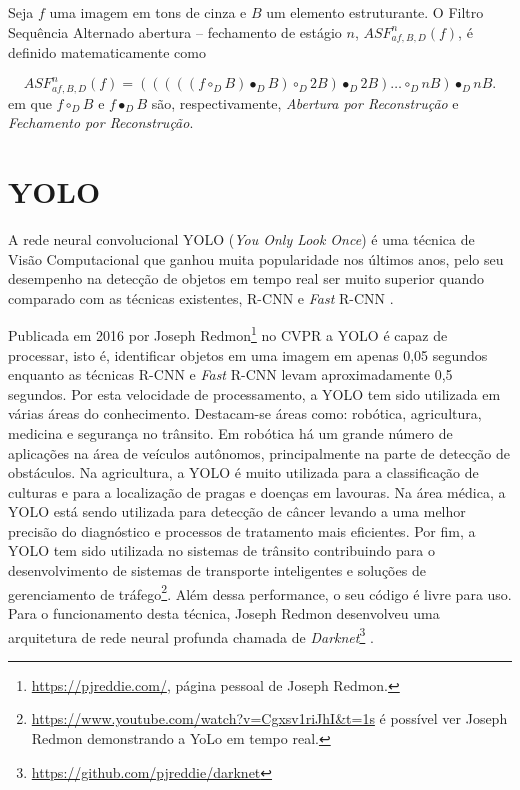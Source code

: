 \begin{define}
	Seja $f$ uma imagem em tons de cinza e $B$ um elemento estruturante. O Filtro Sequência Alternado abertura -- fechamento de estágio $n$, $ASF^{n}_{af,B,D}(f)$, é definido matematicamente como
	
	\begin{equation}
		ASF^{n}_{af,B,D}(f) = (((((f \circ_D B) \bullet_D B) \circ_D 2B) \bullet_D 2B) \dots \circ_D nB) \bullet_D nB. 
	\end{equation}
	em que $f \circ_D B$ e $f \bullet_D B$ são, respectivamente, \textit{Abertura por Reconstrução} e \textit{Fechamento por Reconstrução}.
\end{define}

\section{YOLO}

A rede neural convolucional YOLO (\textit{You Only Look Once}) é uma técnica de Visão Computacional que ganhou muita popularidade nos últimos anos, pelo seu desempenho na detecção de objetos em tempo real ser muito superior quando comparado com as técnicas existentes, R-CNN e \textit{Fast} R-CNN \cite{yolo, yolo2}. 

Publicada em 2016 por Joseph Redmon\footnote{\url{https://pjreddie.com/}, página pessoal de Joseph Redmon.} no CVPR \cite{yolo} a YOLO é capaz de processar, isto é, identificar objetos em uma imagem em apenas 0,05 segundos enquanto as técnicas R-CNN e \textit{Fast} R-CNN levam aproximadamente 0,5 segundos. Por esta velocidade de processamento, a YOLO tem sido utilizada em várias áreas do conhecimento. Destacam-se áreas como: robótica, agricultura, medicina e segurança no trânsito. Em robótica há um grande número de aplicações na área de veículos autônomos, principalmente na parte de detecção de obstáculos. Na agricultura, a YOLO é muito utilizada para a classificação de culturas e para a localização de pragas e doenças em lavouras. Na área médica, a YOLO está sendo utilizada para detecção de câncer levando a uma melhor precisão do diagnóstico e processos de tratamento mais eficientes. Por fim, a YOLO tem sido utilizada no sistemas de trânsito contribuindo para o desenvolvimento de sistemas de transporte inteligentes e soluções de gerenciamento de tráfego\footnote{\url{https://www.youtube.com/watch?v=Cgxsv1riJhI&t=1s} é possível ver Joseph Redmon demonstrando a YoLo em tempo real.}. Além dessa performance, o seu código é livre para uso. Para o funcionamento desta técnica, Joseph Redmon desenvolveu uma arquitetura de rede neural profunda chamada de \textit{Darknet}\footnote{\url{https://github.com/pjreddie/darknet}} \cite{yolo}.

